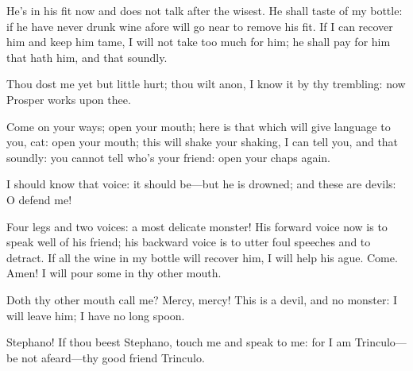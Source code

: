 
\begin{prose_speech}[Stephano] 
He's in his fit now and does not talk after the wisest. He shall taste of my bottle: if he have never drunk wine afore will go near to remove his fit. If I can recover him and keep him tame, I will not take too much for him; he shall pay for him that hath him, and that soundly.
\end{prose_speech}

\begin{prose_speech}[Caliban] 
Thou dost me yet but little hurt; thou wilt anon, I know it by thy trembling: now Prosper works upon thee.
\end{prose_speech}

\begin{prose_speech}[Stephano] 
Come on your ways; open your mouth; here is that which will give language to you, cat: open your mouth; this will shake your shaking, I can tell you, and that soundly: you cannot tell who's your friend: open your chaps again.
\end{prose_speech}

\begin{prose_speech}[Trinculo] 
I should know that voice: it should be—but he is drowned; and these are devils: O defend me!
\end{prose_speech}

\begin{prose_speech}[Stephano] 
Four legs and two voices: a most delicate monster! His forward voice now is to speak well of his friend; his backward voice is to utter foul speeches and to detract. If all the wine in my bottle will recover him, I will help his ague. Come. Amen! I will pour some in thy other mouth.
\end{prose_speech}

	
\begin{prose_speech}[Stephano] 
Doth thy other mouth call me? Mercy, mercy! This is a devil, and no monster: I will leave him; I have no long spoon.
\end{prose_speech}

\begin{prose_speech}[Trinculo] 
Stephano! If thou beest Stephano, touch me and speak to me: for I am Trinculo—be not afeard—thy good friend Trinculo.
\end{prose_speech}

